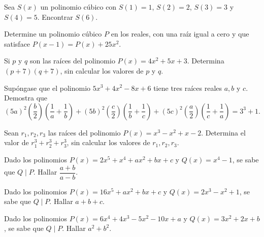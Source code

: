 \begin{section-problem}
    Sea $S(x)$ un polinomio cúbico con $S(1) = 1$, $S(2) = 2$, $S(3) = 3$ y $S(4) = 5$.
    Encontrar $S(6)$.
\end{section-problem}

\begin{section-problem}
    Determine un polinomio cúbico $P$ en los reales, con una raíz igual a cero y que satisface $P(x - 1) = P(x) + 25x^2$.
\end{section-problem}

\begin{section-problem}
    Si $p$ y $q$ son las raíces del polinomio $P(x) = 4x^2 + 5x + 3$.
    Determina $(p + 7)(q + 7)$, sin calcular los valores de $p$ y $q$.
\end{section-problem}

\begin{section-problem}
    Supóngase que el polinomio $5x^3 + 4x^2 - 8x + 6$ tiene tres raíces reales $a, b \mbox{ y } c$.
    Demostra que \[(5a)^2\left(\frac{b}{2}\right)\left(\frac{1}{a} + \frac{1}{b}\right) + (5b)^2\left(\frac{c}{2}\right)\left(\frac{1}{b} + \frac{1}{c}\right)+ (5c)^2\left(\frac{a}{2}\right)\left(\frac{1}{c} + \frac{1}{a}\right) = 3^3 + 1.\]
\end{section-problem}

\begin{section-problem}
    Sean $r_1, r_2, r_3$ las raíces del polinomio $P(x) = x^3 - x^2 + x - 2$.
    Determina el valor de $r^3_1 + r^3_2 + r^3_3$, sin calcular los valores de $r_1, r_2, r_3$.
\end{section-problem}


\begin{section-problem}
    Dado los polinomios $P(x) = 2x^5 + x^4 + ax^2 + bx + c$ y $Q(x) = x^4 - 1$, se sabe que $Q \mid P$.
    Hallar $\dfrac{a + b}{a - b}$.
\end{section-problem}

\begin{section-problem}
    Dado los polinomios $P(x) = 16x^5 + ax^2 + bx + c$ y $Q(x) = 2 x^3 - x^2 + 1$, se sabe que $Q \mid P$.
    Hallar $a + b + c$.
\end{section-problem}

\begin{section-problem}
    Dado los polinomios $P(x) = 6x^4 + 4x^3 - 5x^2 - 10x + a$ y $Q(x) = 3 x^2 + 2x + b$, se sabe que $Q \mid P$.
    Hallar $a^2 + b^2$.
\end{section-problem}


